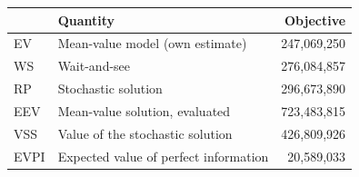 \begin{tabular}{llr}
\toprule
 & Quantity & Objective \\
\midrule
EV & Mean-value model (own estimate) & 247,069,250 \\
WS & Wait-and-see & 276,084,857 \\
RP & Stochastic solution & 296,673,890 \\
EEV & Mean-value solution, evaluated & 723,483,815 \\
VSS & Value of the stochastic solution & 426,809,926 \\
EVPI & Expected value of perfect information & 20,589,033 \\
\bottomrule
\end{tabular}
